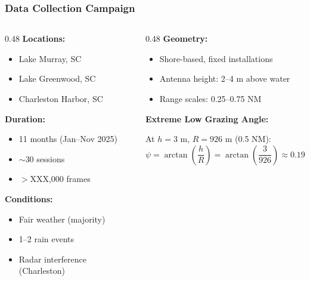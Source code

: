 \documentclass[aspectratio=169, 10pt]{beamer}
\begin{document}
\begin{frame}
  \frametitle{Data Collection Campaign}

  \begin{columns}[T]
    \begin{column}{0.48\textwidth}
      \textbf{Locations:}
      \begin{itemize}
        \item Lake Murray, SC
        \item Lake Greenwood, SC
        \item Charleston Harbor, SC
      \end{itemize}

      \vspace{0.3cm}
      \textbf{Duration:}
      \begin{itemize}
        \item 11 months (Jan--Nov 2025)
        \item $\sim$30 sessions
        \item $>$XXX,000 frames
      \end{itemize}

      \vspace{0.3cm}
      \textbf{Conditions:}
      \begin{itemize}
        \item Fair weather (majority)
        \item 1--2 rain events
        \item Radar interference (Charleston)
      \end{itemize}
    \end{column}

    \begin{column}{0.48\textwidth}
      \textbf{Geometry:}
      \begin{itemize}
        \item Shore-based, fixed installations
        \item Antenna height: 2--4 m above water
        \item Range scales: 0.25--0.75 NM
      \end{itemize}

      \vspace{0.3cm}
      \textbf{Extreme Low Grazing Angle:}

      At $h = 3$ m, $R = 926$ m (0.5 NM):
      \begin{equation*}
        \psi = \arctan\!\left(\frac{h}{R}\right) = \arctan\!\left(\frac{3}{926}\right) \approx 0.19^{\circ}
      \end{equation*}


\end{column}
\end{columns}
\end{frame}
\end{document}
